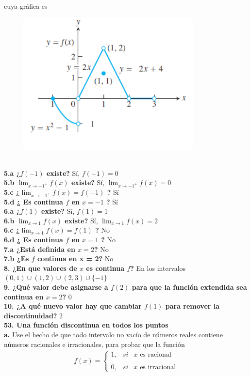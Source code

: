 \documentclass[12pt, letterpaper]{article}
\begin{document}
cuya gráfica es
\begin{figure}[tbh]
\centering
\includegraphics[width=25em]{t13tres}
\end{figure}\\

\textbf{5.a ¿$f(-1)$ existe?} Sí, $f(-1) = 0$\\
\textbf{5.b $\lim_{ x \to -1^+} f(x) $ existe?} Sí, $\lim_{ x \to -1^+} f(x)= 0$\\
\textbf{5.c ¿$\lim_{ x \to -1^+} f(x) = f(-1)$ ?} Sí\\
\textbf{5.d ¿ Es continua $f$ en $x = -1$ ?} Sí\\


\textbf{6.a ¿$f(1)$ existe?} Sí, $f(1) = 1$\\
\textbf{6.b $\lim_{ x \to 1} f(x) $ existe?} Sí, $\lim_{ x \to 1} f(x)= 2$ \\
\textbf{6.c ¿$\lim_{ x \to 1} f(x) = f(1)$ ?} No\\
\textbf{6.d ¿ Es continua $f$ en $x = 1$ ?} No\\


\textbf{7.a ¿Está definida en $x = 2$?} No\\
\textbf{7.b ¿Es $f$ continua en x = 2?} No\\

\textbf{8. ¿En que valores de $x$ es continua $f$?} En los intervalos $(0,1) \cup (1,2) \cup (2,3) \cup \{-1\}$\\


\textbf{9. ¿Qué valor debe asignarse a $f(2)$ para que la función extendida sea continua en $x = 2$?} 0\\


\textbf{10. ¿A qué nuevo valor hay que cambiar $f(1)$ para remover la discontinuidad?} 2\\


\textbf{53.  Una función discontinua en todos los puntos}\\
\textbf{a.} Use el hecho de que todo intervalo no vacío de números reales contiene números racionales e irracionales, para probar que la función
\begin{align*}
f(x)= \left\{ \begin{array}{lcc}
                 1, &   si   & x \text{ es racional} \\
             	\\ 0, &   si   & x \text{ es irracional}
             \end{array}
   \right.
\end{align*}
\end{document}
